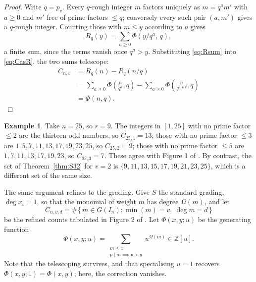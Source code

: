 \documentclass[a4paper,11pt,oneside,reqno]{amsart}
\theoremstyle{definition}
\newtheorem{example}[definition]{Example}
\theoremstyle{remark}
\theoremstyle{plain}
\newcommand{\ZZ}{\mathbb{Z}}
\newcommand{\Om}{\Omega}
\begin{document}
\begin{proof}
  Write \(q = p_v\). Every \(q\)-rough integer \(m\) factors uniquely as
  \(m = q^{a}m'\) with \(a \ge 0\) and \(m'\) free of prime factors \(\le q\);
  conversely every such pair \((a,m')\) gives a \(q\)-rough integer. Counting
  those with \(m \le y\) according to \(a\) gives
  \begin{equation}\label{eq:Rsum}
    R_q(y) = \sum_{a \ge 0}\Phi\!\left(y/q^{a},\,q\right),
  \end{equation}
  a finite sum, since the terms vanish once \(q^{a} > y\). Substituting
  \eqref{eq:Rsum} into \eqref{eq:CasR}, the two sums telescope:
  \begin{equation}\label{eq:telescope}
  \begin{split}
    C_{n,v}&= R_q(n)-R_q(n/q)\\
           &= \sum_{a \ge 0}\Phi\!\left(\frac{n}{q^{a}},q\right)
            -\sum_{a \ge 0}\Phi\!\left(\frac{n}{q^{a+1}},q\right)\\
           &= \Phi(n,q).
  \end{split}
  \end{equation}
\end{proof}

\begin{example}\label{ex:n25}
  Take \(n = 25\), so \(r = 9\). The integers in \([1,25]\) with no prime factor
  \(\le 2\) are the thirteen odd numbers, so \(C_{25,1} = 13\); those with no
  prime factor \(\le 3\) are \(1,5,7,11,13,17,19,23,25\), so \(C_{25,2} = 9\);
  those with no prime factor \(\le 5\) are \(1,7,11,13,17,19,23\), so
  \(C_{25,3} = 7\). These agree with Figure 1 of \cite{Snellman2000}. By contrast,
  the set of Theorem~\ref{thm:S32} for \(v = 2\) is
  \(\{9,11,13,15,17,19,21,23,25\}\), which is a different set of the same size.
\end{example}

The same argument refines to the grading. Give \(S\) the standard grading,
\(\deg x_i = 1\), so that the monomial of weight \(m\) has degree \(\Om(m)\), and
let
\begin{equation}\label{eq:Cvddef}
  C_{n,v,d} = \#\{\,m \in G(I_n) : \min(m) = v,\ \deg m = d\,\}
\end{equation}
be the refined counts tabulated in Figure 2 of \cite{Snellman2000}. Let
\(\Phi(x,y;u)\) be the generating function
\begin{equation}\label{eq:phiu}
  \Phi(x,y;u) = \sum_{\substack{m \le x\\ p \mid m \implies p > y}} u^{\Om(m)}
    \in \ZZ[u].
\end{equation}
Note that the telescoping survives, and that specialising \(u = 1\) recovers
\(\Phi(x,y;1) = \Phi(x,y)\); here, the correction vanishes.
\end{document}

